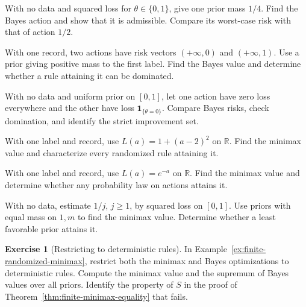 \documentclass[11pt,oneside]{book}
\theoremstyle{definition}
\newtheorem{exercise}{Exercise}[section]
\theoremstyle{remark}
\newcommand{\R}{\mathbb R}
\begin{document}
\begin{practiceexercise}
\label{wex:admissible-nonminimax-posterior-mean}
With no data and squared loss for $\theta\in\{0,1\}$, give one prior mass
$1/4$. Find the Bayes action and show that it is admissible. Compare its
worst-case risk with that of action $1/2$.
\end{practiceexercise}

\begin{practiceexercise}
\label{wex:infinite-bayes-risk-warning}
With one record, two actions have risk vectors $(+\infty,0)$ and
$(+\infty,1)$. Use a prior giving positive mass to the first label. Find the
Bayes value and determine whether a rule attaining it can be dominated.
\end{practiceexercise}

\begin{practiceexercise}
\label{wex:full-support-null-improvement}
With no data and uniform prior on $[0,1]$, let one action have zero loss
everywhere and the other have loss $\mathbf1_{\{\theta=0\}}$. Compare Bayes
risks, check domination, and identify the strict improvement set.
\end{practiceexercise}

\begin{practiceexercise}
\label{wex:coercive-loss-attains}
With one label and record, use $L(a)=1+(a-2)^2$ on $\R$. Find the minimax
value and characterize every randomized rule attaining it.
\end{practiceexercise}

\begin{practiceexercise}
\label{wex:continuous-loss-at-infinity}
With one label and record, use $L(a)=e^{-a}$ on $\R$. Find the minimax value
and determine whether any probability law on actions attains it.
\end{practiceexercise}

\begin{practiceexercise}
\label{wex:countable-squared-least-favorable}
With no data, estimate $1/j$, $j\ge1$, by squared loss on $[0,1]$. Use
priors with equal mass on $1,m$ to find the minimax value. Determine whether
a least favorable prior attains it.
\end{practiceexercise}

\begin{exercise}[Restricting to deterministic rules]
\label{exer:deterministic-minimax-gap}
In Example~\ref{ex:finite-randomized-minimax}, restrict both the
minimax and Bayes optimizations to deterministic rules. Compute
the minimax value and the supremum of Bayes values over all priors.
Identify the property of $S$ in the proof of
Theorem~\ref{thm:finite-minimax-equality} that fails.
\end{exercise}
\end{document}
